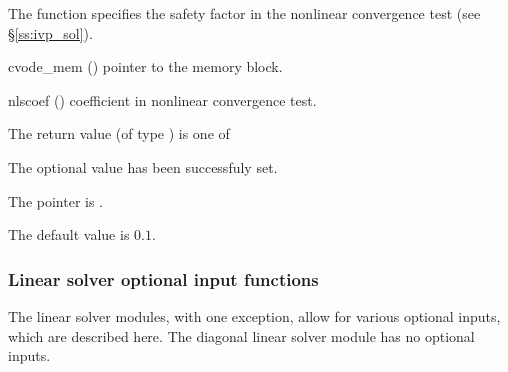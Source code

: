 {
  The function  specifies the safety factor
  in the nonlinear convergence test (see \S\ref{ss:ivp_sol}).
}
{
  \begin{args}
  \item[cvode\_mem] ()
    pointer to the {\cvodes} memory block.
  \item[nlscoef] ()
    coefficient in nonlinear convergence test.
  \end{args}
}
{
  The return value  (of type ) is one of
  \begin{args}
  \item[\Id{SUCCESS}] 
    The optional value has been successfuly set.
  \item[\Id{CVS\_NO\_MEM}]
    The  pointer is .
  \end{args}
}
{
  The default value is $0.1$.
}
\subsubsection{Linear solver optional input functions}
The linear solver modules, with one exception, allow for various optional 
inputs, which are described here. The diagonal linear solver module has no
optional inputs.
